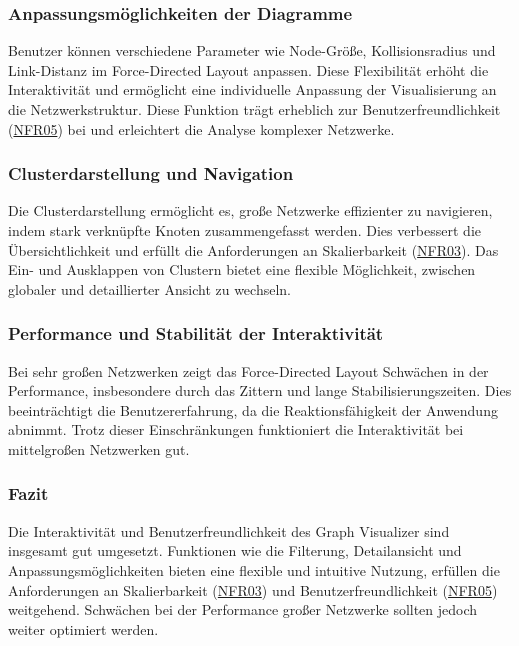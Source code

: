 \subsubsection{Anpassungsmöglichkeiten der Diagramme}

Benutzer können verschiedene Parameter wie Node-Größe, Kollisionsradius und Link-Distanz im Force-Directed Layout anpassen. Diese Flexibilität erhöht die Interaktivität und ermöglicht eine individuelle Anpassung der Visualisierung an die Netzwerkstruktur. Diese Funktion trägt erheblich zur Benutzerfreundlichkeit (\hyperref[NFR05]{NFR05}) bei und erleichtert die Analyse komplexer Netzwerke.

\subsubsection{Clusterdarstellung und Navigation}

Die Clusterdarstellung ermöglicht es, große Netzwerke effizienter zu navigieren, indem stark verknüpfte Knoten zusammengefasst werden. Dies verbessert die Übersichtlichkeit und erfüllt die Anforderungen an Skalierbarkeit (\hyperref[NFR03]{NFR03}). Das Ein- und Ausklappen von Clustern bietet eine flexible Möglichkeit, zwischen globaler und detaillierter Ansicht zu wechseln.

\subsubsection{Performance und Stabilität der Interaktivität}

Bei sehr großen Netzwerken zeigt das Force-Directed Layout Schwächen in der Performance, insbesondere durch das Zittern und lange Stabilisierungszeiten. Dies beeinträchtigt die Benutzererfahrung, da die Reaktionsfähigkeit der Anwendung abnimmt. Trotz dieser Einschränkungen funktioniert die Interaktivität bei mittelgroßen Netzwerken gut.

\subsubsection{Fazit}

Die Interaktivität und Benutzerfreundlichkeit des Graph Visualizer sind insgesamt gut umgesetzt. Funktionen wie die Filterung, Detailansicht und Anpassungsmöglichkeiten bieten eine flexible und intuitive Nutzung, erfüllen die Anforderungen an Skalierbarkeit (\hyperref[NFR03]{NFR03}) und Benutzerfreundlichkeit (\hyperref[NFR05]{NFR05}) weitgehend. Schwächen bei der Performance großer Netzwerke sollten jedoch weiter optimiert werden.